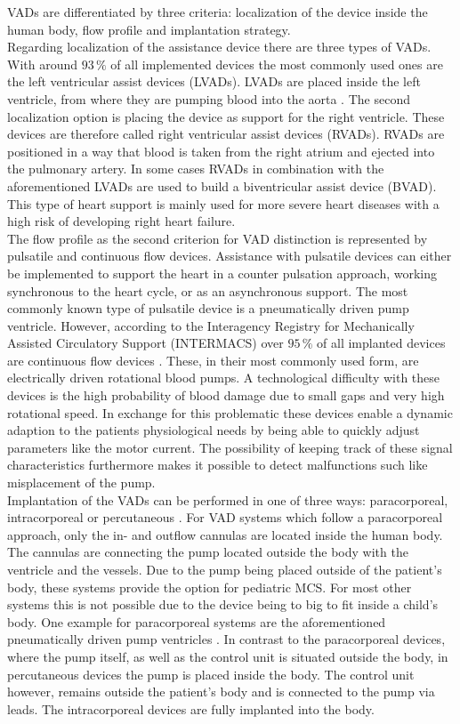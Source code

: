 VADs are differentiated by three criteria: localization of the device inside the human body, flow profile and implantation strategy.
\\Regarding localization of the assistance device there are three types of VADs. With around $93\, \%$ of all implemented devices the most commonly used ones are the left ventricular assist devices (LVADs). \cite{VAD7} LVADs are placed inside the left ventricle, from where they are pumping blood into the aorta \cite{VAD4}. The second localization option is placing the device as support for the right ventricle. These devices are therefore called right ventricular assist devices (RVADs). RVADs are positioned in a way that blood is taken from the right atrium and ejected into the pulmonary artery. \cite{VAD7} In some cases RVADs in combination with the aforementioned LVADs are used to build a biventricular assist device (BVAD). This type of heart support is mainly used for more severe heart diseases with a high risk of developing right heart failure. \cite{VAD11}
\\The flow profile as the second criterion for VAD distinction is represented by pulsatile and continuous flow devices. Assistance with pulsatile devices can either be implemented to support the heart in a counter pulsation approach, working synchronous to the heart cycle, or as an asynchronous support. The most commonly known type of pulsatile device is a pneumatically driven pump ventricle. \cite{VAD1}
However, according to the Interagency Registry for Mechanically Assisted Circulatory Support (INTERMACS) over $95\, \%$ of all implanted devices are continuous flow devices \cite{VAD8}. These, in their most commonly used form, are electrically driven rotational blood pumps. A technological difficulty with these devices is the high probability of blood damage due to small gaps and very high rotational speed. In exchange for this problematic these devices enable a dynamic adaption to the patients physiological needs by being able to quickly adjust parameters like the motor current. The possibility of keeping track of these signal characteristics furthermore makes it possible to detect malfunctions such like misplacement of the pump. \cite{VAD1}
\\Implantation of the VADs can be performed in one of three ways: paracorporeal, intracorporeal or percutaneous \cite{VAD7}. For VAD systems which follow a paracorporeal approach, only the in- and outflow cannulas are located inside the human body. The cannulas are connecting the pump located outside the body with the ventricle and the vessels. Due to the pump being placed outside of the patient's body, these systems provide the option for pediatric MCS. For most other systems this is not possible due to the device being to big to fit inside a child's body. \cite{VAD10} One example for paracorporeal systems are the aforementioned pneumatically driven pump ventricles \cite{VAD1}. In contrast to the paracorporeal devices, where the pump itself, as well as the control unit is situated outside the body, in percutaneous devices the pump is placed inside the body. The control unit however, remains outside the patient's body and is connected to the pump via leads. The intracorporeal devices are fully implanted into the body. \cite{VAD10}
